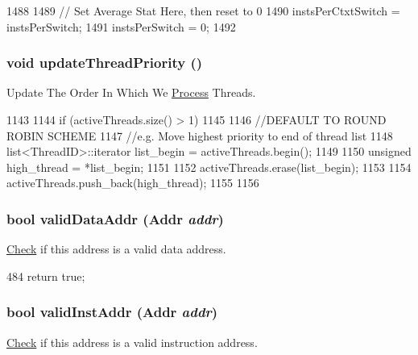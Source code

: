 \begin{DoxyCode}
1488 {
1489     // Set Average Stat Here, then reset to 0    
1490     instsPerCtxtSwitch = instsPerSwitch;
1491     instsPerSwitch = 0;
1492 }
\end{DoxyCode}
\hypertarget{classInOrderCPU_a00247488696e6ff608a2a44673578094}{
\subsubsection[{updateThreadPriority}]{\setlength{\rightskip}{0pt plus 5cm}void updateThreadPriority ()}}
\label{classInOrderCPU_a00247488696e6ff608a2a44673578094}
Update The Order In Which We \hyperlink{classProcess}{Process} Threads. 


\begin{DoxyCode}
1143 {
1144     if (activeThreads.size() > 1)
1145     {
1146         //DEFAULT TO ROUND ROBIN SCHEME
1147         //e.g. Move highest priority to end of thread list
1148         list<ThreadID>::iterator list_begin = activeThreads.begin();
1149 
1150         unsigned high_thread = *list_begin;
1151 
1152         activeThreads.erase(list_begin);
1153 
1154         activeThreads.push_back(high_thread);
1155     }
1156 }
\end{DoxyCode}
\hypertarget{classInOrderCPU_afe01e4cef8897b8a4ff99d575875c9db}{
\subsubsection[{validDataAddr}]{\setlength{\rightskip}{0pt plus 5cm}bool validDataAddr ({\bf Addr} {\em addr})}}
\label{classInOrderCPU_afe01e4cef8897b8a4ff99d575875c9db}
\hyperlink{classCheck}{Check} if this address is a valid data address. 


\begin{DoxyCode}
484 { return true; }
\end{DoxyCode}
\hypertarget{classInOrderCPU_af5f6a59bc2ed83b0cf9203ba8c63bf34}{
\subsubsection[{validInstAddr}]{\setlength{\rightskip}{0pt plus 5cm}bool validInstAddr ({\bf Addr} {\em addr})}}
\label{classInOrderCPU_af5f6a59bc2ed83b0cf9203ba8c63bf34}
\hyperlink{classCheck}{Check} if this address is a valid instruction address. 


